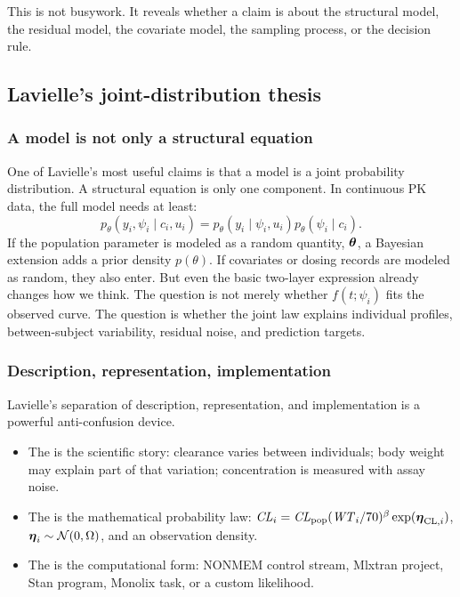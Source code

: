 This is not busywork.  It reveals whether a claim is about the structural model, the residual model, the covariate model, the sampling process, or the decision rule.

\subsection{Lavielle's joint-distribution thesis}

\subsubsection*{A model is not only a structural equation}

One of Lavielle's most useful claims is that a model is a joint probability distribution.  A structural equation is only one component.  In continuous PK data, the full model needs at least:
\[
  p_\theta(y_i,\psi_i\mid c_i,u_i)
  =
  p_\theta(y_i\mid \psi_i,u_i)
  p_\theta(\psi_i\mid c_i).
\]
If the population parameter is modeled as a random quantity, \(\boldsymbol{\theta}\), a Bayesian extension adds a prior density \(p(\theta)\).  If covariates or dosing records are modeled as random, they also enter.  But even the basic two-layer expression already changes how we think.  The question is not merely whether \(f(t;\psi_i)\) fits the observed curve.  The question is whether the joint law explains individual profiles, between-subject variability, residual noise, and prediction targets.

\subsubsection*{Description, representation, implementation}

Lavielle's separation of description, representation, and implementation is a powerful anti-confusion device.

\begin{itemize}[leftmargin=2em]
  \item The  is the scientific story: clearance varies between individuals; body weight may explain part of that variation; concentration is measured with assay noise.
  \item The  is the mathematical probability law: \(\pksym{CL}_i=\pksym{CL}_{\pop}(\pksym{WT}_i/70)^\beta\exp(\reta_{\pklab{CL},i})\), \(\boldsymbol{\eta}_i\sim\mathcal{N}(0,\Omega)\), and an observation density.
  \item The  is the computational form: NONMEM control stream, Mlxtran project, Stan program, Monolix task, or a custom likelihood.
\end{itemize}

